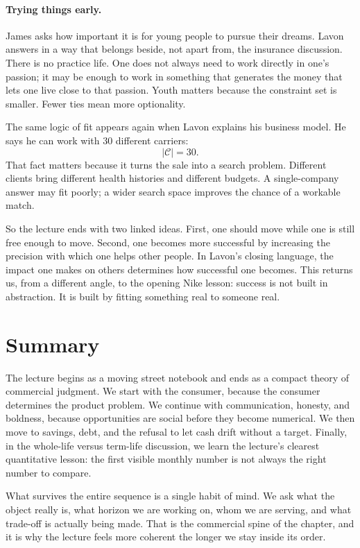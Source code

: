 \paragraph{Trying things early.} James asks how important it is for young people to pursue their dreams. Lavon answers in a way that belongs beside, not apart from, the insurance discussion. There is no practice life. One does not always need to work directly in one's passion; it may be enough to work in something that generates the money that lets one live close to that passion. Youth matters because the constraint set is smaller. Fewer ties mean more optionality.

The same logic of fit appears again when Lavon explains his business model. He says he can work with \(30\) different carriers:
\begin{equation}
|\mathcal C| = 30.
\end{equation}
That fact matters because it turns the sale into a search problem. Different clients bring different health histories and different budgets. A single-company answer may fit poorly; a wider search space improves the chance of a workable match.

So the lecture ends with two linked ideas. First, one should move while one is still free enough to move. Second, one becomes more successful by increasing the precision with which one helps other people. In Lavon's closing language, the impact one makes on others determines how successful one becomes. This returns us, from a different angle, to the opening Nike lesson: success is not built in abstraction. It is built by fitting something real to someone real.

\section{Summary}

The lecture begins as a moving street notebook and ends as a compact theory of commercial judgment. We start with the consumer, because the consumer determines the product problem. We continue with communication, honesty, and boldness, because opportunities are social before they become numerical. We then move to savings, debt, and the refusal to let cash drift without a target. Finally, in the whole-life versus term-life discussion, we learn the lecture's clearest quantitative lesson: the first visible monthly number is not always the right number to compare.

What survives the entire sequence is a single habit of mind. We ask what the object really is, what horizon we are working on, whom we are serving, and what trade-off is actually being made. That is the commercial spine of the chapter, and it is why the lecture feels more coherent the longer we stay inside its order.